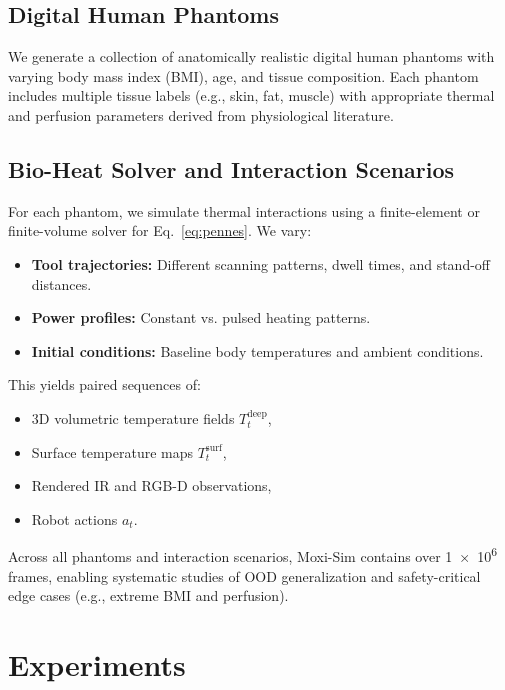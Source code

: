 \documentclass{article}
\begin{document}
\subsection{Digital Human Phantoms}

We generate a collection of anatomically realistic digital human phantoms with varying body mass index (BMI), age, and tissue composition. Each phantom includes multiple tissue labels (e.g., skin, fat, muscle) with appropriate thermal and perfusion parameters derived from physiological literature.

\subsection{Bio-Heat Solver and Interaction Scenarios}

For each phantom, we simulate thermal interactions using a finite-element or finite-volume solver for Eq.~\eqref{eq:pennes}. We vary:

\begin{itemize}
    \item \textbf{Tool trajectories:} Different scanning patterns, dwell times, and stand-off distances.
    \item \textbf{Power profiles:} Constant vs. pulsed heating patterns.
    \item \textbf{Initial conditions:} Baseline body temperatures and ambient conditions.
\end{itemize}

This yields paired sequences of:
\begin{itemize}
    \item 3D volumetric temperature fields $T_t^{\mathrm{deep}}$,
    \item Surface temperature maps $T_t^{\mathrm{surf}}$,
    \item Rendered IR and RGB-D observations,
    \item Robot actions $a_t$.
\end{itemize}

Across all phantoms and interaction scenarios, Moxi-Sim contains over \num{1e6} frames, enabling systematic studies of OOD generalization and safety-critical edge cases (e.g., extreme BMI and perfusion).


\section{Experiments}
\label{sec:experiments}
\end{document}
